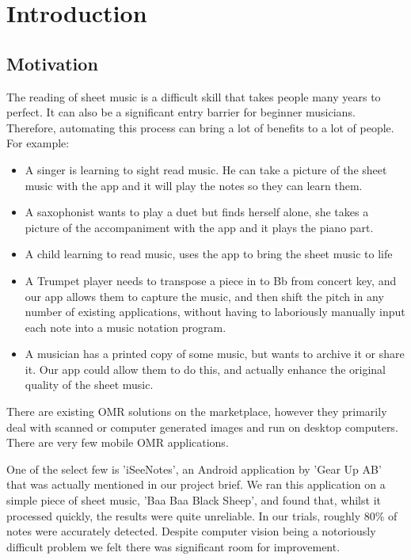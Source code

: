 \section{Introduction}
\subsection{Motivation}
 
The reading of sheet music is a difficult skill that takes people many years to perfect. It can also be a significant entry barrier for beginner musicians. Therefore, automating this process can bring a lot of benefits to a lot of people. For example:

\begin{itemize}
  \item A singer is learning to sight read music. He can take a picture of the sheet music with the app and it will play the notes so they can learn them.
  \item A saxophonist wants to play a duet but finds herself alone, she takes a picture of the accompaniment with the app and it plays the piano part.
  \item A child learning to read music, uses the app to bring the sheet music to life
  \item A Trumpet player needs to transpose a piece in to Bb from concert key, and our app allows them to capture the music, and then shift the pitch in any number of existing applications, without having to laboriously manually input each note into a music notation program.
  \item A musician has a printed copy of some music, but wants to archive it or share it. Our app could allow them to do this, and actually enhance the original quality of the sheet music.
\end{itemize}

There are existing OMR solutions on the marketplace, however they primarily deal with scanned or computer generated images and run on desktop computers. There are very few mobile OMR applications.

One of the select few is 'iSeeNotes', an Android application by 'Gear Up AB'  that was actually mentioned in our project brief. We ran this application on a simple piece of sheet music, 'Baa Baa Black Sheep', and found that, whilst it processed quickly, the results were quite unreliable. In our trials, roughly 80\% of notes were accurately detected. Despite computer vision being a notoriously difficult problem we felt there was significant room for improvement.


